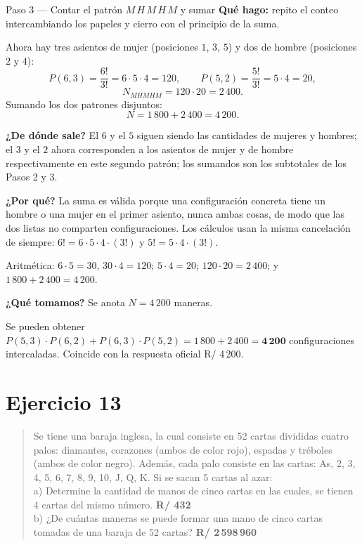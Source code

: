 \documentclass[11pt]{article}
\begin{document}
\begin{paso}{Paso 3 --- Contar el patrón $M\,H\,M\,H\,M$ y sumar}
\textbf{Qué hago:} repito el conteo intercambiando los papeles y cierro con el principio de la suma.

Ahora hay tres asientos de mujer (posiciones $1$, $3$, $5$) y dos de hombre (posiciones $2$ y $4$):
\[
  P(6,3)=\frac{6!}{3!}=6\cdot 5\cdot 4=120,\qquad
  P(5,2)=\frac{5!}{3!}=5\cdot 4=20,
\]
\[
  N_{MHMHM}=120\cdot 20=2\,400 .
\]
Sumando los dos patrones disjuntos:
\[
  N = 1\,800+2\,400 = 4\,200 .
\]

\textbf{¿De dónde sale?} El $6$ y el $5$ siguen siendo las cantidades de mujeres y hombres; el $3$ y el $2$ ahora corresponden a los asientos de mujer y de hombre respectivamente en este segundo patrón; los sumandos son los subtotales de los Pasos 2 y 3.

\textbf{¿Por qué?} La suma es válida porque una configuración concreta tiene un hombre o una mujer en el primer asiento, nunca ambas cosas, de modo que las dos listas no comparten configuraciones. Los cálculos usan la misma cancelación de siempre: $6!=6\cdot 5\cdot 4\cdot(3!)$ y $5!=5\cdot 4\cdot(3!)$.

Aritmética: $6\cdot 5=30$, $30\cdot 4=120$; $5\cdot 4=20$; $120\cdot 20=2\,400$; y $1\,800+2\,400=4\,200$.

\textbf{¿Qué tomamos?} Se anota $N=4\,200$ maneras.
\end{paso}

\begin{resp}
Se pueden obtener $P(5,3)\cdot P(6,2)+P(6,3)\cdot P(5,2)=1\,800+2\,400=\mathbf{4\,200}$ configuraciones intercaladas. Coincide con la respuesta oficial R/ 4\,200.
\end{resp}

\section*{Ejercicio 13}

\begin{quote}
Se tiene una baraja inglesa, la cual consiste en 52 cartas divididas cuatro palos: diamantes, corazones (ambos de color rojo), espadas y tréboles (ambos de color negro). Además, cada palo consiste en las cartas: As, 2, 3, 4, 5, 6, 7, 8, 9, 10, J, Q, K. Si se sacan 5 cartas al azar:\\[2pt]
a) Determine la cantidad de manos de cinco cartas en las cuales, se tienen 4 cartas del mismo número. \quad \textbf{R/ 432}\\
b) ¿De cuántas maneras se puede formar una mano de cinco cartas tomadas de una baraja de 52 cartas? \quad \textbf{R/ 2\,598\,960}
\end{quote}
\end{document}
